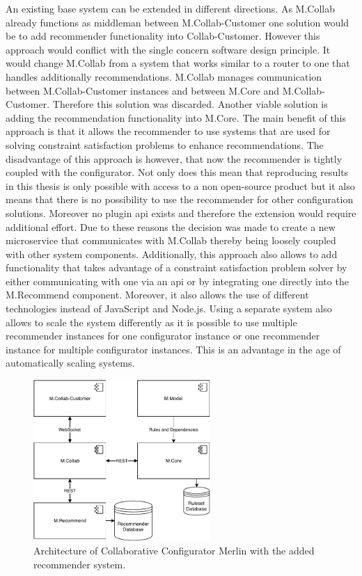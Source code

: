 An existing base system can be extended in different directions. As M.Collab already functions as middleman between M.Collab-Customer one solution would be to add recommender functionality into Collab-Customer. However this approach would conflict with the single concern software design principle. It would change M.Collab from a system that works similar to a router to one that handles additionally recommendations. M.Collab manages communication between M.Collab-Customer instances and between M.Core and M.Collab-Customer. Therefore this solution was discarded.
Another viable solution is adding the recommendation functionality into M.Core. The main benefit of this approach is that it allows the recommender to use systems that are used for solving constraint satisfaction problems to enhance recommendations. The disadvantage of this approach is however, that now the recommender is tightly coupled with the configurator. Not only does this mean that reproducing results in this thesis is only possible with access to a non open-source product but it also means that there is no possibility to use the recommender for other configuration solutions. Moreover no plugin api exists and therefore the extension would require additional effort. Due to these reasons the decision was made to create a new microservice that communicates with M.Collab thereby being loosely coupled with other system components. Additionally, this approach also allows to add functionality that takes  advantage of a constraint satisfaction problem solver by either communicating with one via an api or by integrating one directly into the M.Recommend component. Moreover, it also allows the use of different technologies instead of JavaScript and Node.js. Using a separate system also allows to scale the system differently as it is possible to use multiple recommender instances for one configurator instance or one recommender instance for multiple configurator instances. This is an advantage in the age of automatically scaling systems.

\begin{figure}
    \centering
    \includegraphics[width=0.6\textwidth]{./figures/50_design_and_implementation/MerlinCollabRecommender.pdf}
    \caption{Architecture of Collaborative Configurator Merlin with the added recommender system.}
    \label{fig:DesignImplementation:RecommenderForCollaborativeConfiguratorMerlin}
\end{figure}

